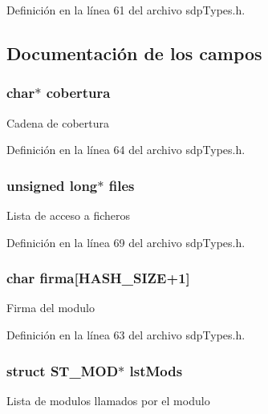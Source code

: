 Definición en la línea 61 del archivo sdp\+Types.\+h.



\subsection{Documentación de los campos}
\hypertarget{struct_s_t___m_o_d_a512e0b2cea6bba7a1eaf1689e8000374}{}
\subsubsection[{cobertura}]{\setlength{\rightskip}{0pt plus 5cm}char$\ast$ cobertura}\label{struct_s_t___m_o_d_a512e0b2cea6bba7a1eaf1689e8000374}
Cadena de cobertura 

Definición en la línea 64 del archivo sdp\+Types.\+h.

\hypertarget{struct_s_t___m_o_d_a70ab4319156766461ca994c2e7550d7d}{}
\subsubsection[{files}]{\setlength{\rightskip}{0pt plus 5cm}unsigned long$\ast$ files}\label{struct_s_t___m_o_d_a70ab4319156766461ca994c2e7550d7d}
Lista de acceso a ficheros 

Definición en la línea 69 del archivo sdp\+Types.\+h.

\hypertarget{struct_s_t___m_o_d_a11de7bbb4add4ed0cf596ea7a05cb841}{}
\subsubsection[{firma}]{\setlength{\rightskip}{0pt plus 5cm}char firma\mbox{[}{\bf H\+A\+S\+H\+\_\+\+S\+I\+Z\+E}+1\mbox{]}}\label{struct_s_t___m_o_d_a11de7bbb4add4ed0cf596ea7a05cb841}
Firma del modulo 

Definición en la línea 63 del archivo sdp\+Types.\+h.

\hypertarget{struct_s_t___m_o_d_a2f7d75b93f5c1884691f10a146c7bb43}{}
\subsubsection[{lst\+Mods}]{\setlength{\rightskip}{0pt plus 5cm}struct {\bf S\+T\+\_\+\+M\+O\+D}$\ast$ lst\+Mods}\label{struct_s_t___m_o_d_a2f7d75b93f5c1884691f10a146c7bb43}
Lista de modulos llamados por el modulo 

